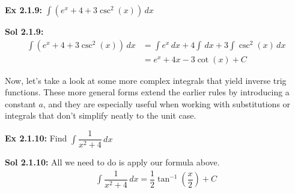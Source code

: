  \begin{tcolorbox}[example]
    \textbf{Ex 2.1.9: } $\int \left(e^x + 4 + 3\csc^2 (x)\right) \, dx$
 \end{tcolorbox}
 \begin{tcolorbox}[solution]
    \textbf{Sol 2.1.9: } \begin{align*}
        \int \left(e^x + 4 + 3\csc^2 (x)\right) \, dx &= \int e^x \, dx + 4\int \, dx + 3\int \csc^2 (x) \, dx \\[11pt]
        & = \boxed{e^x + 4x - 3\cot (x) + C}
    \end{align*}
 \end{tcolorbox} 

Now, let's take a look at some more complex integrals that yield inverse trig functions. These more general forms extend the earlier rules by introducing a constant $a$, and they are especially useful when working with substitutions or integrals that don't simplify neatly to the unit case. \par

\begin{center}
\end{center}

\begin{tcolorbox}[example]
    \textbf{Ex 2.1.10: } Find $\int \dfrac{1}{x^2 + 4} \, dx$
\end{tcolorbox}
\begin{tcolorbox}[solution]
    \textbf{Sol 2.1.10:} All we need to do is apply our formula above. \begin{align*}
        \int \dfrac{1}{x^2 + 4} \, dx = \boxed{\dfrac{1}{2}\tan^{-1} \left(\dfrac{x}{2}\right) + C}
    \end{align*}
\end{tcolorbox} \vspace{11pt}

